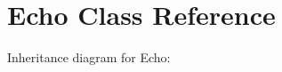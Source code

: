 \hypertarget{classEcho}{}\section{Echo Class Reference}
\label{classEcho}


Inheritance diagram for Echo\+:
